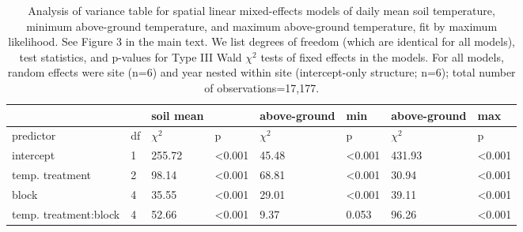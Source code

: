 \documentclass{article}
\begin{document}
\begin{table}[ht]
\centering
\caption{Analysis of variance table for spatial linear mixed-effects models of daily mean soil temperature, minimum above-ground temperature, and maximum above-ground temperature, fit by maximum likelihood. See Figure 3 in the main text. We list degrees of freedom (which are identical for all models), test statistics, and p-values for Type III Wald $\chi^{2}$ tests of fixed effects in the models. For all models, random effects were site (n=6) and year nested within site (intercept-only structure; n=6); total number of observations=17,177.} 
\label{table:blocks_space}
\begin{tabular}{|p{}|p{}|p{}p{}|p{}p{}|p{}p{}|}
   \hline
 &  & soil mean &   & above-ground & min & above-ground & max \\ 
   \hline
predictor & df & $\chi^2$ & p & $\chi^2$ & p & $\chi^2$ & p \\ 
   \hline
intercept & 1 & 255.72 & <0.001 & 45.48 & <0.001 & 431.93 & <0.001 \\ 
  temp. treatment & 2 & 98.14 & <0.001 & 68.81 & <0.001 & 30.94 & <0.001 \\ 
  block & 4 & 35.55 & <0.001 & 29.01 & <0.001 & 39.11 & <0.001 \\ 
  temp. treatment:block & 4 & 52.66 & <0.001 & 9.37 & 0.053 & 96.26 & <0.001 \\ 
   \hline
\end{tabular}
\end{table}\clearpage
\end{document}
